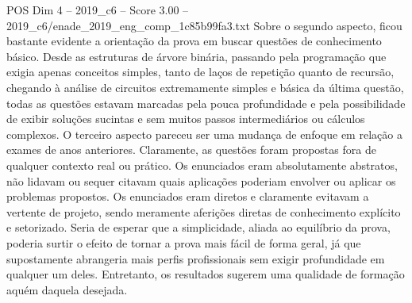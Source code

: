 \begin{textsample}{POS Dim 4 – 2019\_c6 – Score 3.00 – 2019\_c6/enade\_2019\_eng\_comp\_1c85b99fa3.txt}
Sobre o segundo aspecto, ficou bastante evidente a orientação da prova em buscar questões de conhecimento básico.
Desde as estruturas de árvore binária, passando pela programação que exigia apenas conceitos simples, tanto de laços de repetição quanto de recursão, chegando à análise de circuitos extremamente simples e básica da última questão, todas as questões estavam marcadas pela pouca profundidade e pela possibilidade de exibir soluções sucintas e sem muitos passos intermediários ou cálculos complexos.
O terceiro aspecto pareceu ser uma mudança de enfoque em relação a exames de anos anteriores.
Claramente, as questões foram propostas fora de qualquer contexto real ou prático.
Os enunciados eram absolutamente abstratos, não lidavam ou sequer citavam quais aplicações poderiam envolver ou aplicar os problemas propostos.
Os enunciados eram diretos e claramente evitavam a vertente de projeto, sendo meramente aferições diretas de conhecimento explícito e setorizado.
Seria de esperar que a simplicidade, aliada ao equilíbrio da prova, poderia surtir o efeito de tornar a prova mais fácil de forma geral, já que supostamente abrangeria mais perfis profissionais sem exigir profundidade em qualquer um deles.
Entretanto, os resultados sugerem uma qualidade de formação aquém daquela desejada.

\end{textsample}
